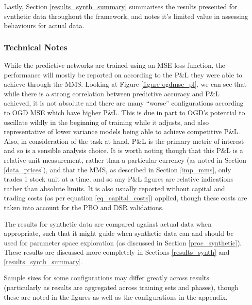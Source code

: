 \documentclass[a4paper,11pt,oneside]{article}
\theoremstyle{plain}
\theoremstyle{definition}
\begin{document}
	Lastly, Section \ref{results_synth_summary} summarises the results presented for synthetic data throughout the framework, and notes it's limited value in assessing behaviours for actual data.
	
	\subsubsection{Technical Notes}
	
	While the predictive networks are trained using an MSE loss function, the performance will mostly be reported on according to the P\&L they were able to achieve through the MMS. Looking at Figure \ref{figure-ogdmse_pl}, we can see that while there is a strong correlation between predictive accuracy and P\&L achieved, it is not absolute and there are many ``worse'' configurations according to OGD MSE which have higher P\&L. This is due in part to OGD's potential to oscillate wildly in the beginning of training while it adjusts, and also representative of lower variance models being able to achieve competitive P\&L. Also, in consideration of the task at hand, P\&L is the primary metric of interest and so is a sensible analysis choice. It is worth noting though that this P\&L is a relative unit measurement, rather than a particular currency (as noted in Section \ref{data_prices}), and that the MMS, as described in Section \ref{imp_mms}, only trades 1 stock unit at a time, and so any P\&L figures are relative indications rather than absolute limits. It is also usually reported without capital and trading costs (as per equation \eqref{eq_capital_costs}) applied, though these costs are taken into account for the PBO and DSR validations. \newline

	The results for synthetic data are compared against actual data when appropriate, such that it might guide when synthetic data can and should be used for parameter space exploration (as discussed in Section \ref{proc_synthetic}). These results are discussed more completely in Sections \ref{results_synth} and \ref{results_synth_summary}.\newline

	Sample sizes for some configurations may differ greatly across results (particularly as results are aggregated across training sets and phases), though these are noted in the figures as well as the configurations in the appendix.\newline
	
\end{document}
